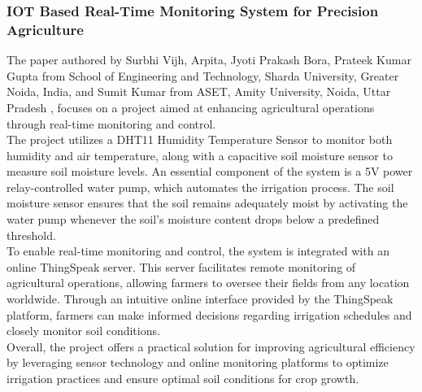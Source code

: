 \documentclass[12pt, a4paper]{article}
\begin{document}
\subsubsection{IOT Based Real-Time Monitoring System for Precision Agriculture}
The paper authored by Surbhi Vijh, Arpita, Jyoti Prakash Bora, Prateek Kumar Gupta from School of Engineering and Technology, Sharda University, Greater Noida, India, and Sumit Kumar from ASET, Amity University, Noida, Uttar Pradesh \cite{10463399}, focuses on a project aimed at enhancing agricultural operations through real-time monitoring and control.\\
The project utilizes a DHT11 Humidity Temperature Sensor to monitor both humidity and air temperature, along with a capacitive soil moisture sensor to measure soil moisture levels. An essential component of the system is a 5V power relay-controlled water pump, which automates the irrigation process. The soil moisture sensor ensures that the soil remains adequately moist by activating the water pump whenever the soil's moisture content drops below a predefined threshold.\\
To enable real-time monitoring and control, the system is integrated with an online ThingSpeak server. This server facilitates remote monitoring of agricultural operations, allowing farmers to oversee their fields from any location worldwide. Through an intuitive online interface provided by the ThingSpeak platform, farmers can make informed decisions regarding irrigation schedules and closely monitor soil conditions.\\
Overall, the project offers a practical solution for improving agricultural efficiency by leveraging sensor technology and online monitoring platforms to optimize irrigation practices and ensure optimal soil conditions for crop growth.
\end{document}
